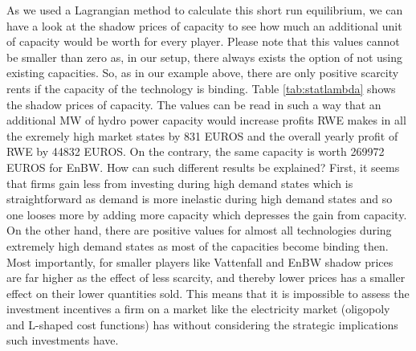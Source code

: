 As we used a Lagrangian method to calculate this short run equilibrium, we can have a look at the shadow prices of capacity to see how much an additional unit of capacity would be worth for every player. Please note that this values cannot be smaller than zero as, in our setup, there always exists the option of not using existing capacities. So, as in our example above, there are only positive scarcity rents if the capacity of the technology is binding. Table \ref{tab:statlambda} shows the shadow prices of capacity. The values can be read in such a way that an additional MW of hydro power capacity would increase profits RWE makes in all the exremely high market states by 831 EUROS and the overall yearly profit of RWE by 44832 EUROS. On the contrary, the same capacity is worth 269972 EUROS for EnBW. How can such different results be explained? First, it seems that firms gain less from investing during high demand states which is straightforward as demand is more inelastic during high demand states and so one looses more by adding more capacity which depresses the gain from capacity. On the other hand, there are positive values for almost all technologies during extremely high demand states as most of the capacities become binding then.
Most importantly, for smaller players like Vattenfall and EnBW shadow prices are far higher as the effect of less scarcity, and thereby lower prices has a smaller effect on their lower quantities sold. This means that it is impossible to assess the investment incentives a firm on a market like the electricity market (oligopoly and L-shaped cost functions) has without considering the strategic implications such investments have.









